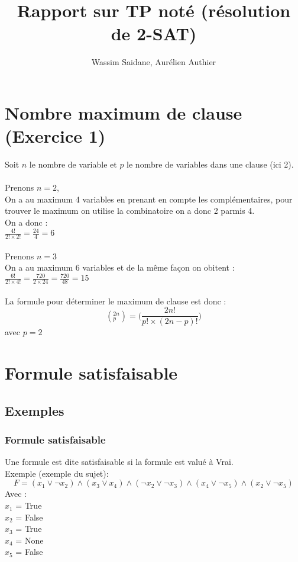 \documentclass{article}
\title{Rapport sur TP noté (résolution de 2-SAT)}
\author{Wassim Saidane, Aurélien Authier}
\date{}
\begin{document}
    \lstset{language=python}
    \maketitle
    \tableofcontents
    \newpage
    \section{Nombre maximum de clause (Exercice 1)}
    Soit $n$ le nombre de variable et $p$ le nombre de variables dans une clause (ici 2). \\
    \\
    Prenons $n=2$, \\
    On a au maximum 4 variables en prenant en compte les complémentaires, pour trouver le maximum on utilise la combinatoire on a donc 2 parmis 4.\\
    On a donc : \\
    $\frac{4!}{2! \times 2!}=\frac{24}{4}=6$ \\
    \\
    Prenons $n=3$ \\
    On a au maximum 6 variables et de la même façon on obitent : \\
    $\frac{6!}{2! \times 4!}=\frac{720}{2 \times 24}=\frac{720}{48}=15$ \\
    \\
    La formule pour déterminer le maximum de clause est donc : 
    \begin{equation*}
        (^{2n}_p)=\biggl(\frac{2n!}{p! \times (2n-p)!}\biggr)
    \end{equation*}
    avec $p=2$
    \section{Formule satisfaisable}
    \subsection{Exemples}
    \subsubsection{Formule satisfaisable}
    Une formule est dite satisfaisable si la formule est valué à Vrai. \\
    Exemple (exemple du sujet): \\
    \begin{equation*}
        F=(x_1 \lor \neg x_2) \wedge (x_3 \lor x_4) \wedge (\neg x_2 \lor \neg x_3) \wedge (x_4 \lor \neg x_5) \wedge (x_2 \lor \neg x_5)
    \end{equation*}
    Avec : \\
    $x_1$ = True \\
    $x_2$ = False \\
    $x_3$ = True \\
    $x_4$ = None \\ 
    $x_5$ = False \\
    \newpage
\end{document}
